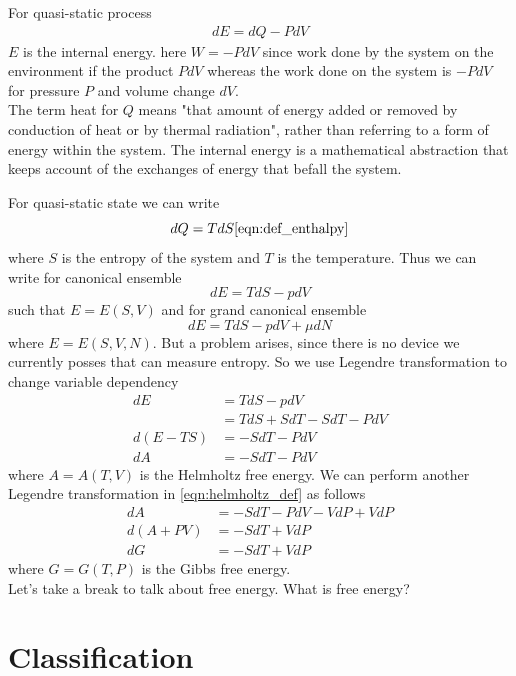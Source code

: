 For quasi-static process
\begin{align}
	dE = dQ - P dV
\end{align}
$E$ is the internal energy.
here $W = -P dV$
since work done by the system on the environment if the product $P dV$ whereas the work done on the system is $-P dV$ for pressure $P$ and volume change $dV$.\\
The term heat for $Q$ means "that  amount of energy added or removed by conduction of heat or by thermal radiation", rather than referring to a form of energy within the system. 
The internal energy is a mathematical abstraction that keeps account of the exchanges of energy that befall the system.

For quasi-static state we can write
\begin{equation}
dQ = T dS
\ref{eqn:def_enthalpy}
\end{equation}
where $S$ is the entropy of the system and $T$ is the temperature.
Thus we can write for canonical ensemble
\begin{equation}
dE = TdS - pdV
\end{equation}
such that $E=E(S,V)$  and 
for grand canonical ensemble 
\begin{equation}
dE = TdS - pdV + \mu dN
\end{equation}
where $E=E(S,V,N)$.
But a problem arises, since there is no device we currently posses that can measure entropy. So we use Legendre transformation to change variable dependency
\begin{align}
	dE  	&= TdS - pdV  \nonumber \\ 
	&= TdS + SdT - SdT - PdV  \nonumber \\ 
	d(E-TS) &= -SdT - PdV  \nonumber \\
	dA 		&= -SdT - PdV \label{eqn:helmholtz_def}
\end{align}
where $A=A(T,V)$  is the Helmholtz free energy. We can perform another Legendre transformation in \ref{eqn:helmholtz_def} as follows
\begin{align}
	dA 		&= -SdT - PdV -VdP + VdP \nonumber \\
	d(A+PV) &= -SdT + VdP \nonumber \\
	dG      &= -SdT + VdP \label{eqn:gibbs_def}
\end{align}
where $G=G(T,P)$ is the Gibbs free energy.\\
Let's take a break to talk about free energy. What is free energy?
\section{Classification}
